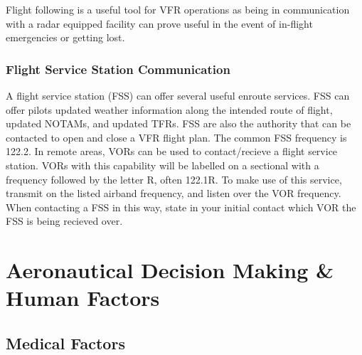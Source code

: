 \documentclass[12pt]{article}
\begin{document}
			Flight following is a useful tool for VFR operations as being in communication with a radar equipped facility can prove useful in the event of in-flight emergencies or getting lost.

		\subsubsection{Flight Service Station Communication}
			A flight service station (FSS) can offer several useful enroute services. FSS can offer pilots updated weather information along the intended route of flight, updated NOTAMs, and updated TFRs. FSS are also the authority that can be contacted to open and close a VFR flight plan. The common FSS frequency is 122.2. In remote areas, VORs can be used to contact/recieve a flight service station. VORs with this capability will be labelled on a sectional with a frequency followed by the letter R, often 122.1R. To make use of this service, transmit on the listed airband frequency, and listen over the VOR frequency. When contacting a FSS in this way, state in your initial contact which VOR the FSS is being recieved over.
\section{Aeronautical Decision Making \& Human Factors}
	\subsection{Medical Factors}
\end{document}
